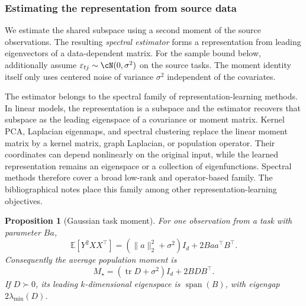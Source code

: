 \documentclass[11pt,twoside]{article}
\newcommand{\E}{\mathbb E}
\newtheorem{proposition}[theorem]{Proposition}
\theoremstyle{definition}
\theoremstyle{remark}
\begin{document}
\subsubsection{Estimating the representation from source data}

We estimate the shared subspace using a second moment of the source
observations. The resulting \emph{spectral estimator} forms a representation
from leading eigenvectors of a data-dependent matrix. For the sample bound
below, additionally assume
$\varepsilon_{tj}\sim\cN(0,\sigma^2)$ on the source tasks. The moment
identity itself only uses centered noise of variance $\sigma^2$ independent
of the covariates.

The estimator belongs to the spectral family of representation-learning
methods. In linear models, the representation is a subspace and the estimator
recovers that subspace as the leading eigenspace of a covariance or moment
matrix. Kernel PCA, Laplacian eigenmaps, and spectral clustering replace the
linear moment matrix by a kernel matrix, graph Laplacian, or population
operator. Their coordinates can depend nonlinearly on the original input,
while the learned representation remains an eigenspace or a collection of
eigenfunctions. Spectral methods therefore cover a broad low-rank and
operator-based family. The bibliographical notes place this family among
other representation-learning objectives.

\begin{proposition}[Gaussian task moment]
\label{prop:gaussian-task-moment}
For one observation from a task with parameter $Ba$,
\begin{equation}
 \E[Y^2XX^\top]
 =(\|a\|_2^2+\sigma^2)I_d+2Baa^\top B^\top.
 \label{eq:gaussian-moment}
\end{equation}
Consequently the average population moment is
\begin{equation}
 M_\star=(\operatorname{tr}D+\sigma^2)I_d+2BDB^\top.
 \label{eq:population-moment}
\end{equation}
If $D\succ0$, its leading $k$-dimensional eigenspace is
$\operatorname{span}(B)$, with eigengap $2\lambda_{\min}(D)$.
\end{proposition}
\end{document}
